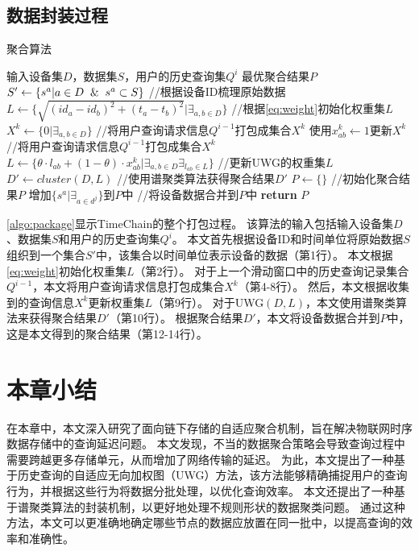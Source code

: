 \subsection{数据封装过程}
\begin{algorithm}[t]
	\caption{聚合算法}
	\label{algo:package}
    \begin{algorithmic}[1]
        \REQUIRE 输入设备集$D$，数据集$S$，用户的历史查询集$Q^i$
        \ENSURE 最优聚合结果$P$
        \STATE $S' \gets \{s^a | a \in D \And s^a \subset S\}$ //根据设备ID梳理原始数据
        \STATE $L \gets \Big\{ \sqrt{ (id_a - id_b)^2 + (t_a - t_b)^2 } \Big| \exists_{a,b \in D} \Big\}$ //根据\autoref{eq:weight}初始化权重集$L$
        \STATE $X^k \gets \{0 | \exists_{a,b \in D} \}$ //将用户查询请求信息$Q^{i-1}$打包成集合$X^k$
                \STATE \textnormal{使用$x^k_{ab} \gets 1 $更新$X^k$} //将用户查询请求信息$Q^{i-1}$打包成集合$X^k$
            \ENDIF
        \ENDFOR
        \STATE $L \gets \Big\{ \theta \cdot l_{ab} + (1 - \theta) \cdot x_{ab}^k \Big| \exists_{a,b \in D} \exists_{l_{ab} \in L} \Big\}$ //更新UWG的权重集$L$
        \STATE $D' \gets \textit{cluster}(D, L)$ //使用谱聚类算法获得聚合结果$D'$
        \STATE $P \gets \{\}$ //初始化聚合结果$P$
            \STATE \textnormal{增加$\{ s^a | \exists_{a \in d^j} \}$到$P$中} //将设备数据合并到$P$中
        \ENDFOR
        \STATE \textbf{return} $P$
    \end{algorithmic}
\end{algorithm}

\ref{algo:package}显示TimeChain的整个打包过程。
该算法的输入包括输入设备集$D$、数据集$S$和用户的历史查询集$Q^i$。
本文首先根据设备ID和时间单位将原始数据$S$组织到一个集合$S'$中，该集合以时间单位表示设备的数据（第1行）。
本文根据\autoref{eq:weight}初始化权重集$L$（第2行）。
对于上一个滑动窗口中的历史查询记录集合$Q^{i-1}$，本文将用户查询请求信息打包成集合$X^k$（第4-8行）。
然后，本文根据收集到的查询信息$X^k$更新权重集$L$（第9行）。
对于UWG$(D,L)$，本文使用谱聚类算法来获得聚合结果$D'$（第10行）。
根据聚合结果$D'$，本文将设备数据合并到$P$中，这是本文得到的聚合结果（第12-14行）。

\section{本章小结}
在本章中，本文深入研究了面向链下存储的自适应聚合机制，旨在解决物联网时序数据存储中的查询延迟问题。
本文发现，不当的数据聚合策略会导致查询过程中需要跨越更多存储单元，从而增加了网络传输的延迟。
为此，本文提出了一种基于历史查询的自适应无向加权图（UWG）方法，该方法能够精确捕捉用户的查询行为，并根据这些行为将数据分批处理，以优化查询效率。
本文还提出了一种基于谱聚类算法的封装机制，以更好地处理不规则形状的数据聚类问题。
通过这种方法，本文可以更准确地确定哪些节点的数据应放置在同一批中，以提高查询的效率和准确性。


